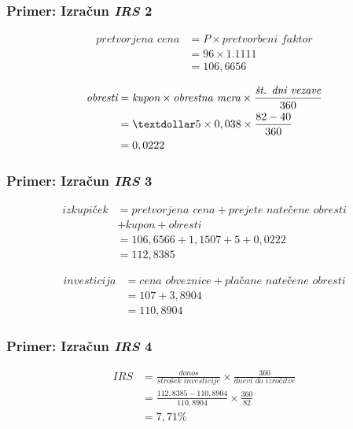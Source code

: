 \documentclass[14pt]{beamer}
\begin{document}
\begin{frame}
    \frametitle{Primer: Izračun \textit{IRS} 2}
    
    \begin{align*}
        \textit{pretvorjena cena} 
        &= \textit{P} \times \textit{pretvorbeni faktor} \\
        &= 96 \times 1.1111 \\
        &= 106,6656
    \end{align*}
    
    \begin{align*}
        \textit{obresti}
        &= \textit{kupon} \times \textit{obrestna mera} \times 
            \frac{\textit{št. dni vezave}}{360} \\
        &= \textdollar5 \times 0,038 \times \frac{82 - 40}{360} \\
        &= 0,0222 
    \end{align*}

\end{frame}


\begin{frame}
    \frametitle{Primer: Izračun \textit{IRS} 3}
    
    \begin{align*}
        \textit{izkupiček} 
        &= \textit{pretvorjena cena} + \textit{prejete natečene obresti} \\
        &+ \textit{kupon} + \textit{obresti} \\
        &= 106,6566 + 1,1507 + 5 + 0,0222 \\
        &= 112,8385 
    \end{align*}
    
    \begin{align*}
        \textit{investicija}
        &= \textit{cena obveznice} + \textit{plačane natečene obresti} \\
        &= 107 + 3,8904 \\
        &=110,8904
    \end{align*}

    \note[item]{}

\end{frame}


\begin{frame}
    \frametitle{Primer: Izračun \textit{IRS} 4}

    \begin{align*}
        \textit{IRS} 
        &= \frac{\textit{donos}}{\textit{strošek investicije}} \times 
            \frac{360}{\textit{dnevi do izročitve}} \\
        &= \frac{112,8385 - 110,8904}{110,8904} \times \frac{360}{82} \\
        &= 7,71\% 
    \end{align*}

    \note[item]{}

\end{frame}
\end{document}
